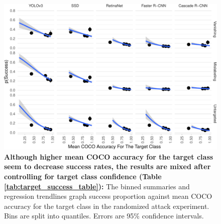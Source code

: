 \begin{figure}[tb]

{\centering \includegraphics{rmd_imgs/target_success_graph-1} 

}

\caption{\textbf{Although higher mean COCO accuracy for the target class seem to decrease success rates, the results are mixed after controlling for target class confidence (Table \ref{tab:target_success_table}):}  The binned summaries and regression trendlines graph success proportion against mean COCO accuracy for the target class in the randomized attack experiment. Bins are split into quantiles. Errors are 95\% confidence intervals. }\label{fig:target_success_graph}
\end{figure}

\begingroup\fontsize{9}{11}\selectfont


